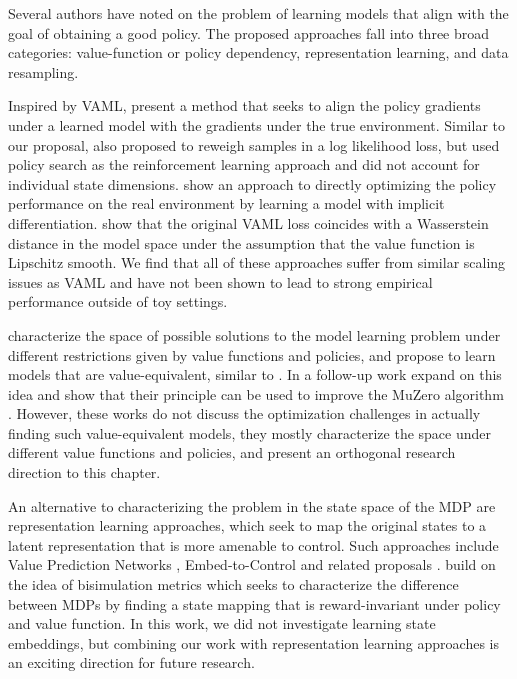 Several authors have noted on the problem of learning models that align with the goal of obtaining a good policy. The proposed approaches fall into three broad categories: value-function or policy dependency, representation learning, and data resampling.

Inspired by VAML, \cite{abachi2020policy} present a method that seeks to align the policy gradients under a learned model with the gradients under the true environment. Similar to our proposal, \cite{doro2020gradient} also proposed to reweigh samples in a log likelihood loss, but used policy search as the reinforcement learning approach and did not account for individual state dimensions. \cite{nikishin2021control} show an approach to directly optimizing the policy performance on the real environment by learning a model with implicit differentiation. \cite{asadi2018equivalence} show that the original VAML loss coincides with a Wasserstein distance in the model space under the assumption that the value function is Lipschitz smooth. We find that all of these approaches suffer from similar scaling issues as VAML and have not been shown to lead to strong empirical performance outside of toy settings.

\cite{grimm2020value} characterize the space of possible solutions to the model learning problem under different restrictions given by value functions and policies, and propose to learn models that are value-equivalent, similar to \cite{vaml}. In a follow-up work \cite{grimm2021proper} expand on this idea and show that their principle can be used to improve the MuZero algorithm \parencite{schrittwieser2020mastering}. However, these works do not discuss the optimization challenges in actually finding such value-equivalent models, they mostly characterize the space under different value functions and policies, and present an orthogonal research direction to this chapter.

An alternative to characterizing the problem in the state space of the MDP are representation learning approaches, which seek to map the original states to a latent representation that is more amenable to control. Such approaches include Value Prediction Networks \parencite{oh2017value}, Embed-to-Control \parencite{10.5555/2969442.2969546} and related proposals \parencite{levine2020prediction,cui2021controlaware}. \cite{zhang2021learning} build on the idea of bisimulation metrics \parencite{ferns2004metrics,ferns2011bisimulation} which seeks to characterize the difference between MDPs by finding a state mapping that is reward-invariant under policy and value function. 
In this work, we did not investigate learning state embeddings, but combining our work with representation learning approaches is an exciting direction for future research.

